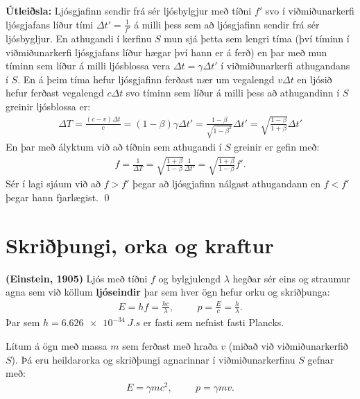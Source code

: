\ifdefined \wholebook \else\documentclass[oneside]{book}\usepackage{EdlBook}\graphicspath{{figures/}}
\begin{document}
\textbf{Útleiðsla:} Ljósgjafinn sendir frá sér ljósbylgjur með tíðni $f'$ svo í viðmiðunarkerfi ljósgjafans líður tími $\Delta t' = \frac{1}{f'}$ á milli þess sem að ljósgjafinn sendir frá sér ljósbygljur. En athugandi í kerfinu $S$ mun sjá þetta sem lengri tíma (því tíminn í viðmiðunarkerfi ljósgjafans líður hægar því hann er á ferð) en þar með mun tíminn sem líður á milli ljósblossa vera $\Delta t = \gamma \Delta t'$ í viðmiðunarkerfi athugandans í $S$. En á þeim tíma hefur ljósgjafinn ferðast nær um vegalengd $v \Delta t$ en ljósið hefur ferðast vegalengd $c \Delta t$ svo tíminn sem líður á milli þess að athugandinn í $S$ greinir ljósblossa er:
\begin{align*}
    \Delta T = \frac{(c-v)\Delta t}{c} = \left(1 - \beta \right) \gamma \Delta t' = \frac{1-\beta}{\sqrt{1-\beta^2}}\Delta t' = \sqrt{\frac{1- \beta}{1+\beta}} \Delta t'
\end{align*}
En þar með ályktum við að tíðnin sem athugandi í $S$ greinir er gefin með:
\begin{align*}
    f = \frac{1}{\Delta T} = \sqrt{\frac{1 + \beta}{1-\beta}} \frac{1}{\Delta t'} = \sqrt{\frac{1 + \beta}{1-\beta}} f'.
\end{align*}
Sér í lagi sjáum við að $f > f'$ þegar að ljósgjafinn nálgast athugandann en $f < f'$ þegar hann fjarlægist.
\qed

\section{Skriðþungi, orka og kraftur}

\begin{tcolorbox}
\begin{definition}
\textbf{(Einstein, 1905)} Ljós með tíðni $f$ og bylgjulengd $\lambda$ hegðar sér eins og straumur agna sem við köllum \textbf{ljóseindir} þar sem hver ögn hefur orku og skriðþunga:
\begin{align*}
    E = hf = \frac{hc}{\lambda}, \hspace{1cm} p = \frac{E}{c} = \frac{h}{\lambda}.
\end{align*}
Þar sem $h = \SI{6.626e-34}{J.s}$ er fasti sem nefnist fasti Plancks.
\end{definition}
\end{tcolorbox}

\begin{tcolorbox}
\begin{theorem}
Lítum á ögn með massa $m$ sem ferðast með hraða $v$ (miðað við viðmiðunarkerfið $S$). Þá eru heildarorka og skriðþungi agnarinnar í viðmiðunarkerfinu $S$ gefnar með:
\begin{align*}
   E = \gamma mc^2, \hspace{1cm} p = \gamma mv.
\end{align*}
\end{theorem}
\end{tcolorbox}
\end{document}
